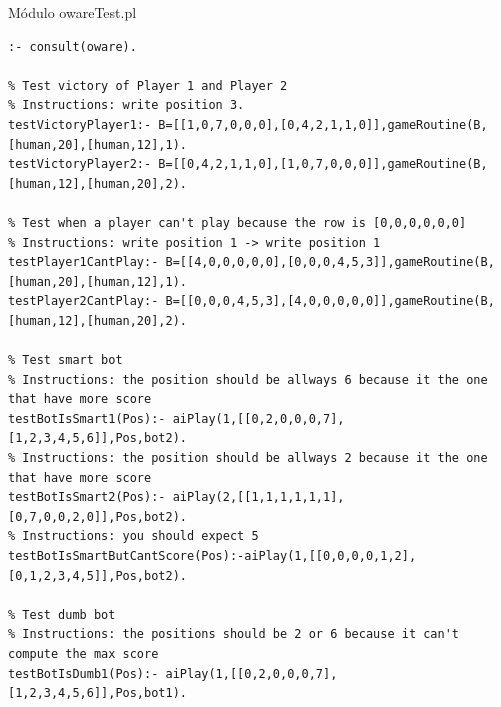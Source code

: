 \documentclass[15pt,a4paper]{article}
\begin{document}
Módulo owareTest.pl

\begin{verbatim}
:- consult(oware).

% Test victory of Player 1 and Player 2
% Instructions: write position 3.
testVictoryPlayer1:- B=[[1,0,7,0,0,0],[0,4,2,1,1,0]],gameRoutine(B,[human,20],[human,12],1). 
testVictoryPlayer2:- B=[[0,4,2,1,1,0],[1,0,7,0,0,0]],gameRoutine(B,[human,12],[human,20],2). 

% Test when a player can't play because the row is [0,0,0,0,0,0]
% Instructions: write position 1 -> write position 1
testPlayer1CantPlay:- B=[[4,0,0,0,0,0],[0,0,0,4,5,3]],gameRoutine(B,[human,20],[human,12],1).
testPlayer2CantPlay:- B=[[0,0,0,4,5,3],[4,0,0,0,0,0]],gameRoutine(B,[human,12],[human,20],2).

% Test smart bot
% Instructions: the position should be allways 6 because it the one that have more score
testBotIsSmart1(Pos):- aiPlay(1,[[0,2,0,0,0,7],[1,2,3,4,5,6]],Pos,bot2).
% Instructions: the position should be allways 2 because it the one that have more score
testBotIsSmart2(Pos):- aiPlay(2,[[1,1,1,1,1,1],[0,7,0,0,2,0]],Pos,bot2).
% Instructions: you should expect 5
testBotIsSmartButCantScore(Pos):-aiPlay(1,[[0,0,0,0,1,2],[0,1,2,3,4,5]],Pos,bot2).

% Test dumb bot
% Instructions: the positions should be 2 or 6 because it can't compute the max score
testBotIsDumb1(Pos):- aiPlay(1,[[0,2,0,0,0,7],[1,2,3,4,5,6]],Pos,bot1).
\end{verbatim}
\end{document}
